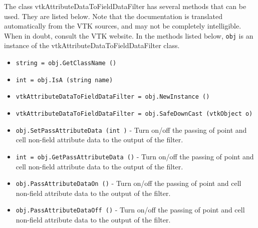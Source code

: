 The class vtkAttributeDataToFieldDataFilter has several methods that can be used.
  They are listed below.
Note that the documentation is translated automatically from the VTK sources,
and may not be completely intelligible.  When in doubt, consult the VTK website.
In the methods listed below, \verb|obj| is an instance of the vtkAttributeDataToFieldDataFilter class.
\begin{itemize}
\item  \verb|string = obj.GetClassName ()|

\item  \verb|int = obj.IsA (string name)|

\item  \verb|vtkAttributeDataToFieldDataFilter = obj.NewInstance ()|

\item  \verb|vtkAttributeDataToFieldDataFilter = obj.SafeDownCast (vtkObject o)|

\item  \verb|obj.SetPassAttributeData (int )| -  Turn on/off the passing of point and cell non-field attribute data to the
 output of the filter.

\item  \verb|int = obj.GetPassAttributeData ()| -  Turn on/off the passing of point and cell non-field attribute data to the
 output of the filter.

\item  \verb|obj.PassAttributeDataOn ()| -  Turn on/off the passing of point and cell non-field attribute data to the
 output of the filter.

\item  \verb|obj.PassAttributeDataOff ()| -  Turn on/off the passing of point and cell non-field attribute data to the
 output of the filter.

\end{itemize}
